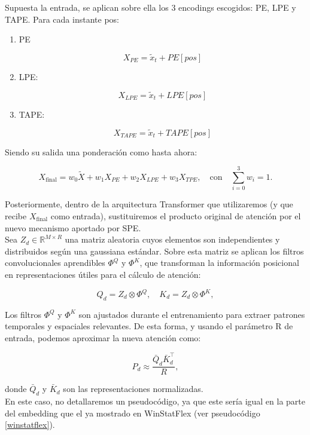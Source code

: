 Supuesta la entrada, se aplican sobre ella los 3 encodings escogidos: PE, LPE y TAPE. Para cada instante pos:

\begin{enumerate}
	\item PE

	$$
	X_{PE} = \tilde{x}_t + PE[pos]
	$$
	\item LPE:
	

	$$
	X_{LPE} = \tilde{x}_t + LPE[pos]
	$$
	
	\item TAPE:
	
	$$
	X_{TAPE} = \tilde{x}_t + TAPE[pos]
	$$
	
\end{enumerate}


Siendo su salida una ponderación como hasta ahora:

$$
X_{\text{final}} = w_0 \tilde{X} + w_1 X_{PE} + w_2 X_{LPE} + w_3 X_{TPE}, \quad \text{con} \quad \sum_{i=0}^3 w_i = 1.
$$

Posteriormente, dentro de la arquitectura Transformer que utilizaremos (y que recibe \(X_{\text{final}}\) como entrada), sustituiremos el producto original de atención por el nuevo mecanismo aportado por SPE.\\

Sea \(Z_d \in \mathbb{R}^{M \times R}\) una matriz aleatoria cuyos elementos son independientes y distribuidos según una gaussiana estándar. Sobre esta matriz se aplican los filtros convolucionales aprendibles \(\Phi^Q\) y \(\Phi^K\), que transforman la información posicional en representaciones útiles para el cálculo de atención:

\[
Q_d = Z_d \otimes \Phi^Q, \quad K_d = Z_d \otimes \Phi^K,
\]

Los filtros \(\Phi^Q\) y \(\Phi^K\) son ajustados durante el entrenamiento para extraer patrones temporales y espaciales relevantes. De esta forma, y usando el parámetro R de entrada, podemos aproximar la nueva atención como:

\[
P_d \approx \frac{\bar{Q}_d \bar{K}_d^\top}{R},
\]

donde \(\bar{Q}_d\) y \(\bar{K}_d\) son las representaciones normalizadas.\\

En este caso, no detallaremos un pseudocódigo, ya que este sería igual en la parte del embedding que el ya mostrado en WinStatFlex (ver pseudocódigo \ref{winstatflex}).\\

